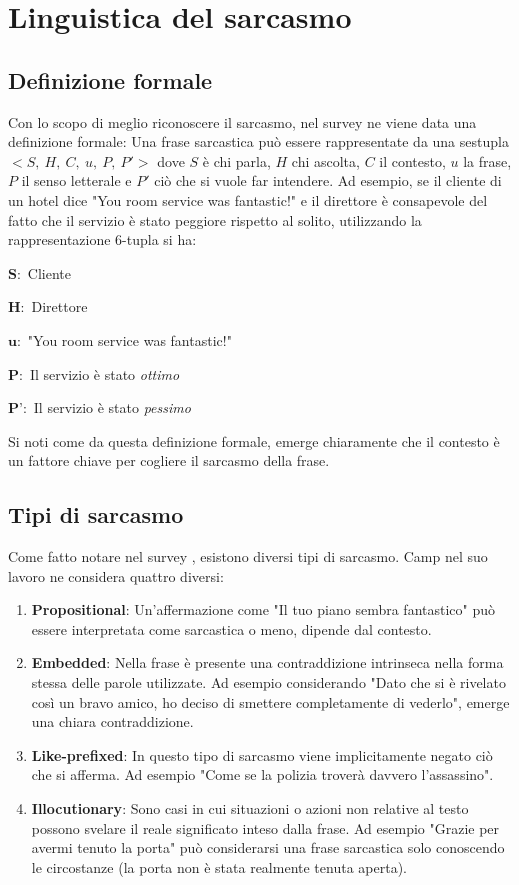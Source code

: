 \documentclass[oneside]{book}
\begin{document}
 
\section{Linguistica del sarcasmo}
\subsection{Definizione formale}
Con lo scopo di meglio riconoscere il sarcasmo, nel survey \cite{survey2} ne viene data una definizione formale:
Una frase sarcastica può essere rappresentate da una sestupla $<S,\ H,\ C,\ u,\ P,\ P'>$ dove $S$ è chi parla, $H$ chi ascolta, $C$ il contesto, $u$ la frase, $P$ il senso letterale e $P'$ ciò che si vuole far intendere. Ad esempio, se il cliente di un hotel dice "You room service was fantastic!" e il direttore è consapevole del fatto che il servizio è stato peggiore rispetto al solito, utilizzando la rappresentazione 6-tupla si ha:


$\textbf{S}:$ Cliente

$\textbf{H}:$ Direttore

$\textbf{u}:$ "You room service was fantastic!"

$\textbf{P}:$ Il servizio è stato \textit{ottimo}

$\textbf{P'}:$ Il servizio è stato \textit{pessimo}

\noindent
Si noti come da questa definizione formale, emerge chiaramente che il contesto è un fattore chiave per cogliere il sarcasmo della frase.
\subsection{Tipi di sarcasmo}
Come fatto notare nel survey \cite{survey5}, esistono diversi tipi di sarcasmo. Camp nel suo lavoro \cite{tipi-sarcasmo} ne considera quattro diversi:
\begin{enumerate}
	\item \textbf{Propositional}: Un'affermazione come "Il tuo piano sembra fantastico" può essere interpretata come sarcastica o meno, dipende dal contesto.
	\item \textbf{Embedded}: Nella frase è presente una contraddizione intrinseca nella forma stessa delle parole utilizzate. Ad esempio considerando "Dato che si è rivelato così un bravo amico, ho deciso di smettere completamente di vederlo", emerge una chiara contraddizione.
	\item \textbf{Like-prefixed}: In questo tipo di sarcasmo viene implicitamente negato ciò che si afferma. Ad esempio "Come se la polizia troverà davvero l'assassino".
	\item \textbf{Illocutionary}: Sono casi in cui situazioni o azioni non relative al testo possono svelare il reale significato inteso dalla frase. Ad esempio "Grazie per avermi tenuto la porta" può considerarsi una frase sarcastica solo conoscendo le circostanze (la porta non è stata realmente tenuta aperta).
	
\end{enumerate}
\end{document}

